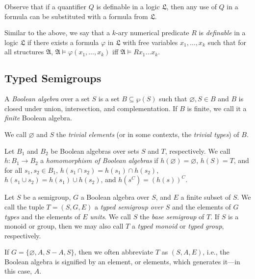 \documentclass[a4paper,UKenglish,cleveref, autoref, thm-restate, anonymous]{lipics-v2021}
\begin{document}
\begin{remark}
    Observe that if a quantifier $Q$ is definable in a logic $\mathfrak{L}$, then any use of $Q$ in a formula can be substituted with a formula from $\mathfrak{L}$.
\end{remark}

\begin{definition}
    Similar to the above, we say that a $k$-ary numerical predicate $R$ is \emph{definable} in a logic $\mathfrak{L}$ if there exists a formula $\varphi$ in $\mathfrak{L}$ with free variables $x_1, \dots, x_k$ such that for all structures $\mathfrak{A}$, $\mathfrak{A} \models \varphi(x_1, \dots, x_k)$ iff $\mathfrak{A} \models R x_1\dots x_k$.
\end{definition}

\subsection{Typed Semigroups}\label{sec:backgroundtyped}


\begin{definition}
    A \emph{Boolean algebra} over a set $S$ is a set $B \subseteq \wp(S)$ such that $\varnothing, S \in B$ and $B$ is closed under union, intersection, and complementation. If $B$ is finite, we call it a \emph{finite} Boolean algebra.

    We call $\varnothing$ and $S$ the \emph{trivial elements} (or in some contexts, the \emph{trivial types}) of $B$.
\end{definition}

\begin{definition}
    Let $B_1$ and $B_2$ be Boolean algebras over sets $S$ and $T$, respectively. We call $h : B_1 \rightarrow B_2$ a \emph{homomorphism of Boolean algebras} if $h(\varnothing) = \varnothing$, $h(S) = T$, and for all $s_1, s_2 \in B_1$, $h(s_1 \cap s_2) = h(s_1) \cap h(s_2)$, $h(s_1 \cup s_2) = h(s_1) \cup h(s_2)$, and $h(s^C) = (h(s))^C$.
\end{definition}

\begin{definition}
    Let $S$ be a semigroup, $G$ a Boolean algebra over $S$, and $E$ a finite subset of $S$. We call the tuple $T = (S, G, E)$ a \emph{typed semigroup over $S$} and the elements of $G$ \emph{types} and the elements of $E$ \emph{units}. We call $S$ the \emph{base semigroup} of $T$. If $S$ is a monoid or group, then we may also call $T$ a \emph{typed monoid} or \emph{typed group}, respectively.

    If $G = \{\varnothing, A, S - A, S\}$, then we often abbreviate $T$ as $(S, A, E)$, i.e., the Boolean algebra is signified by an element, or elements, which generates it---in this case, $A$. 
\end{definition}
\end{document}
